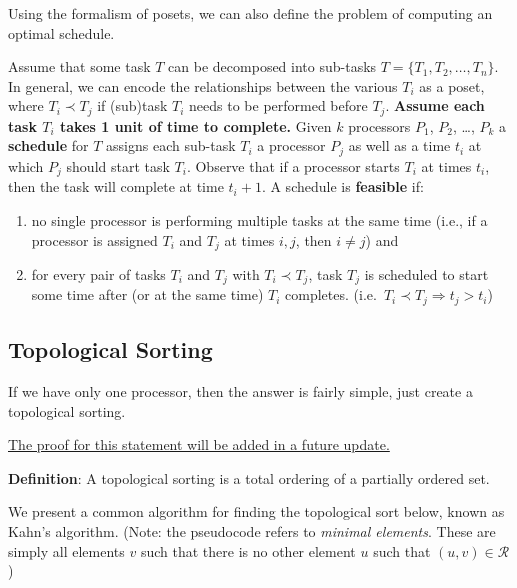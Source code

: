 \documentclass{article}
\begin{document}
    Using the formalism of posets, we can also define the problem of computing an optimal schedule.

    \vspace{3mm} Assume that some task $T$ can be decomposed into sub-tasks $T = \{T_{1}, T_{2}, \dots, T_{n}\}$. In general, we can encode the relationships between the various $T_{i}$ as a poset, where $T_{i} \prec T_{j}$ if (sub)task $T_{i}$ needs to be performed before $T_{j}$. \textbf{Assume each task $T_{i}$ takes 1 unit of time to complete.} Given $k$ processors $P_{1}$, $P_{2}$, \dots, $P_{k}$ a \textbf{schedule} for $T$ assigns each sub-task $T_{i}$ a processor $P_{j}$ as well as a time $t_{i}$ at which $P_{j}$ should start task $T_{i}$. Observe that if a processor starts $T_{i}$ at times $t_{i}$, then the task will complete at time $t_{i} + 1$. A schedule is \textbf{feasible} if:
    \begin{enumerate}[label = \arabic*]
        \item no single processor is performing multiple tasks at the same time (i.e., if a processor is assigned $T_{i}$ and $T_{j}$ at times $i, j$, then $i \ne j$) and
        \item for every pair of tasks $T_{i}$ and $T_{j}$ with $T_{i} \prec T_{j}$, task $T_{j}$ is scheduled to start some time after (or at the same time) $T_{i}$ completes. (i.e.\ $T_{i} \prec T_{j} \Rightarrow t_{j} > t_{i}$)
    \end{enumerate}

    \subsection*{Topological Sorting}
    If we have only one processor, then the answer is fairly simple, just create a topological sorting. 
    
    \underline{The proof for this statement will be added in a future update.}
    
    \vspace{3mm}
    \textbf{Definition}: A topological sorting is a total ordering of a partially ordered set.

    \vspace{3mm}
    We present a common algorithm for finding the topological sort below, known as Kahn's algorithm. (Note: the pseudocode refers to \textit{minimal elements}. These are simply all elements $v$ such that there is no other element $u$ such that $(u, v) \in \mathcal{R}$)

    
\end{document}
